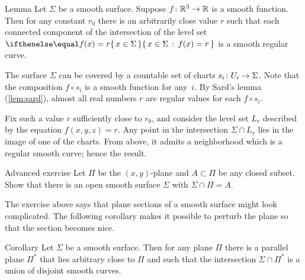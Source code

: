 \begin{thm}{Lemma}\label{lem:reg-section}
Let $\Sigma$ be a smooth surface.
Suppose $f\:\mathbb{R}^3\z\to\mathbb{R}$ is a smooth function.
Then for any constant $r_0$ there is an arbitrarily close value $r$ such that 
each connected component of the intersection of the level set $\set{x\in\Sigma}{f(x)=r}$ is a smooth regular curve.
\end{thm}

The surface $\Sigma$ can be covered by a countable set of charts $s_i\:U_i\z\to \Sigma$.
Note that the composition $f\circ s_i$ is a smooth function for any~$i$.
By Sard's lemma (\ref{lem:sard}), almost all real numbers $r$ are regular values for each $f\circ s_i$.

Fix such a value $r$ sufficiently close to $r_0$, and consider the level set $L_r$ described by the equation $f(x,y,z)=r$.
Any point in the intersection $\Sigma\cap L_r$ lies in the image of one of the charts.
From above, it admits a neighborhood which is a regular smooth curve;
hence the result.\qeds

\begin{thm}{Advanced exercise}\label{ex:plane-section}
Let $\Pi$ be the $(x,y)$-plane and $A \subset \Pi$ be any closed subset. Show that there is an open smooth surface $\Sigma$ with $\Sigma \cap \Pi = A$.
\end{thm}

The exercise above says that plane sections of a smooth surface might look complicated.
The following corollary makes it possible to perturb the plane so that the section becomes nice.

\begin{thm}{Corollary}
Let $\Sigma$ be a smooth surface.
Then for any plane $\Pi$ there is a parallel plane $\Pi^{*}$ that lies arbitrary close to $\Pi$ and such that the intersection $\Sigma\cap\Pi^{*}$ is a union of disjoint smooth curves.
\end{thm}



